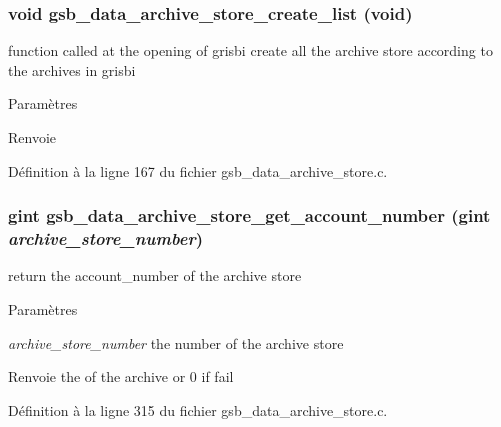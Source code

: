 \subsubsection[{gsb\_\-data\_\-archive\_\-store\_\-create\_\-list}]{\setlength{\rightskip}{0pt plus 5cm}void gsb\_\-data\_\-archive\_\-store\_\-create\_\-list (void)}\label{gsb__data__archive__store_8h_af1c48e5ac4d5590dc16f386bcfb10391}
function called at the opening of grisbi create all the archive store according to the archives in grisbi


\begin{DoxyParams}{Paramètres}
\item[{\em }]\end{DoxyParams}
\begin{DoxyReturn}{Renvoie}

\end{DoxyReturn}


Définition à la ligne 167 du fichier gsb\_\-data\_\-archive\_\-store.c.

\subsubsection[{gsb\_\-data\_\-archive\_\-store\_\-get\_\-account\_\-number}]{\setlength{\rightskip}{0pt plus 5cm}gint gsb\_\-data\_\-archive\_\-store\_\-get\_\-account\_\-number (gint {\em archive\_\-store\_\-number})}\label{gsb__data__archive__store_8h_af8cce1446aecd71b0622144006b3916d}
return the account\_\-number of the archive store


\begin{DoxyParams}{Paramètres}
\item[{\em archive\_\-store\_\-number}]the number of the archive store\end{DoxyParams}
\begin{DoxyReturn}{Renvoie}
the of the archive or 0 if fail 
\end{DoxyReturn}


Définition à la ligne 315 du fichier gsb\_\-data\_\-archive\_\-store.c.


